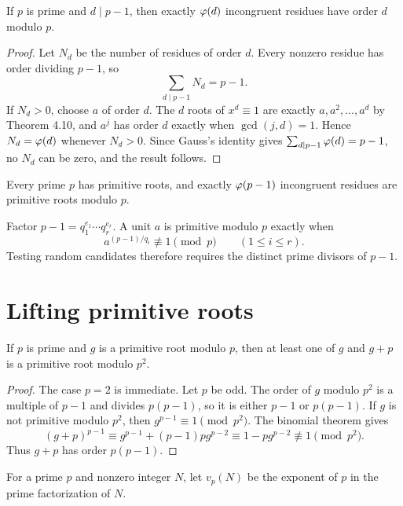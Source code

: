 \begin{thm}
If $p$ is prime and $d\mid p-1$, then exactly $\varphi(d)$ incongruent residues have order $d$ modulo $p$.
\end{thm}
\begin{proof}
Let $N_d$ be the number of residues of order $d$.  Every nonzero residue has order dividing $p-1$, so
\[
 \sum_{d\mid p-1}N_d=p-1.
\]
If $N_d>0$, choose $a$ of order $d$.  The $d$ roots of $x^d\equiv1$ are exactly
$a,a^2,\ldots,a^d$ by Theorem 4.10, and $a^j$ has order $d$ exactly when $\gcd(j,d)=1$.  Hence $N_d=\varphi(d)$ whenever $N_d>0$.
Since Gauss's identity gives $\sum_{d\mid p-1}\varphi(d)=p-1$, no $N_d$ can be zero, and the result follows.
\end{proof}

\begin{cor}
Every prime $p$ has primitive roots, and exactly $\varphi(p-1)$ incongruent residues are primitive roots modulo $p$.
\end{cor}

\begin{remark}
Factor $p-1=q_1^{e_1}\cdots q_r^{e_r}$.  A unit $a$ is primitive modulo $p$ exactly when
\[
 a^{(p-1)/q_i}\not\equiv1\pmod p
 \qquad(1\le i\le r).
\]
Testing random candidates therefore requires the distinct prime divisors of $p-1$.
\end{remark}

\section{Lifting primitive roots}

\begin{thm}
If $p$ is prime and $g$ is a primitive root modulo $p$, then at least one of $g$ and $g+p$ is a primitive root modulo $p^2$.
\end{thm}
\begin{proof}
The case $p=2$ is immediate.  Let $p$ be odd.  The order of $g$ modulo $p^2$ is a multiple of $p-1$ and divides $p(p-1)$, so it is either $p-1$ or $p(p-1)$.  If $g$ is not primitive modulo $p^2$, then
$g^{p-1}\equiv1\pmod{p^2}$.  The binomial theorem gives
\[
 (g+p)^{p-1}
 \equiv g^{p-1}+(p-1)pg^{p-2}
 \equiv1-pg^{p-2}\not\equiv1\pmod{p^2}.
\]
Thus $g+p$ has order $p(p-1)$.
\end{proof}

For a prime $p$ and nonzero integer $N$, let $v_p(N)$ be the exponent of $p$ in the prime factorization of $N$.

